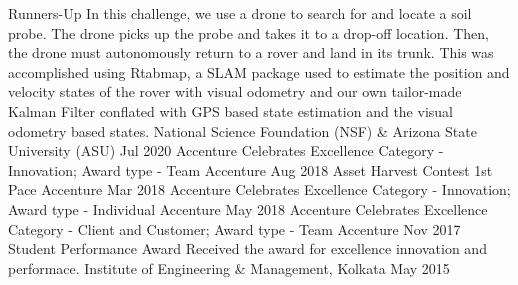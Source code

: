 \begin{cvhonors}
	\cvhonor
	{Runners-Up}
	{In this challenge, we use a drone to search for and locate a soil probe. The drone picks up the probe and takes it to a drop-off location. Then, the drone must autonomously return to a rover and land in its trunk. This was accomplished using Rtabmap, a SLAM package used to estimate the position and velocity states of the rover with visual odometry and our own tailor-made Kalman Filter conflated with GPS based state estimation and the visual odometry based states.}
	{National Science Foundation (NSF) \& Arizona State University (ASU)}
	{Jul 2020}
	\cvhonor
	{Accenture Celebrates Excellence}
	{Category - Innovation; Award type - Team}
	{Accenture}
	{Aug 2018}
	\cvhonor
	{Asset Harvest Contest}
	{1st Pace}
	{Accenture}
	{Mar 2018}
	\cvhonor
	{Accenture Celebrates Excellence}
	{Category - Innovation; Award type - Individual}
	{Accenture}
	{May 2018}
	\cvhonor
	{Accenture Celebrates Excellence}
	{Category - Client and Customer; Award type - Team}
	{Accenture}
	{Nov 2017}
	\cvhonor
	{Student Performance Award}
	{Received the award for excellence innovation and performace.}
	{Institute of Engineering \& Management, Kolkata}
	{May 2015}
\end{cvhonors}
